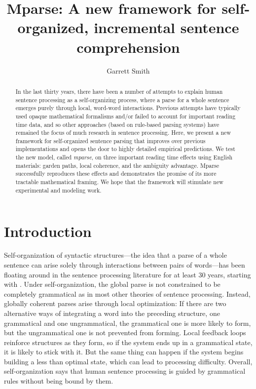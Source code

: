 \documentclass[a4paper, 12pt]{article}
\title{Mparse: A new framework for self-organized, incremental sentence
    comprehension}
\author{Garrett Smith}
\begin{document}
\maketitle

\begin{abstract}
In the last thirty years, there have been a number of attempts to explain human
sentence processing as a self-organizing process, where a parse for a whole
sentence emerges purely through local, word-word interactions. Previous
attempts have typically used opaque mathematical formalisms
and/or failed to account for important reading time data, and so other
approaches (based on rule-based parsing systems) have remained the focus of
much research in sentence processing. Here, we present a new framework for
self-organized sentence parsing that improves over previous implementations and
opens the door to highly detailed empirical predictions. We test the new model,
called \emph{mparse}, on three important reading time effects using English
materials: garden paths, local coherence, and the ambiguity advantage.
Mparse successfully reproduces these effects and demonstrates the promise of
its more tractable mathematical framing. We hope that the framework will
stimulate new experimental and modeling work.
\end{abstract}




\section{Introduction}
Self-organization of syntactic structures---the idea that a parse of a whole
sentence can arise solely through interactions between pairs of words---has
been floating around in the sentence processing literature for at least 30
years, starting with \citet{kempen1989incremental}. Under self-organization,
the global parse is not constrained to be completely grammatical as in most
other theories of sentence processing. Instead, globally coherent parses arise
through local optimization: If there are two alternative ways of integrating a
word into the preceding structure, one grammatical and one ungrammatical, the
grammatical one is more likely to form, but the ungrammatical one is not
prevented from forming. Local feedback loops reinforce structures as they form,
so if the system ends up in a grammatical state, it is likely to stick with it.
But the same thing can happen if the system begins building a less than optimal
state, which can lead to processing difficulty.  Overall, self-organization
says that human sentence processing is guided by grammatical rules without
being bound by them.
\end{document}
